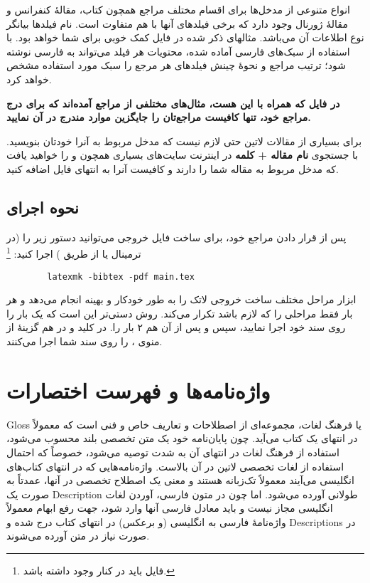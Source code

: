 انواع متنوعی از مدخل‌ها برای اقسام مختلف مراجع همچون کتاب، مقالهٔ کنفرانس و مقالهٔ ژورنال وجود دارد که برخی فیلدهای آنها با هم متفاوت است.
نام فیلدها بیانگر نوع اطلاعات آن می‌باشد. مثالهای ذکر شده در فایل  کمک خوبی برای شما خواهد بود.
با استفاده از سبک‌های فارسی آماده شده، محتویات هر فیلد می‌تواند به فارسی نوشته شود؛ ترتیب مراجع و نحوهٔ چینش فیلدهای هر مرجع را سبک مورد استفاده  مشخص خواهد کرد.

\textbf{در فایل
	که همراه با این \پ هست، مثال‌های مختلفی از مراجع آمده‌اند که برای درج مراجع خود، تنها کافیست مراجع‌تان را جایگزین موارد مندرج در آن نمایید.
}

برای بسیاری از مقالات لاتین حتی لازم نیست که مدخل مربوط به آنرا خودتان بنویسید. با جستجوی
\textbf{نام مقاله + کلمه
	}
در اینترنت سایت‌های بسیاری همچون
 و 
را خواهید یافت که مدخل
مربوط به مقاله شما را دارند و کافیست آنرا به انتهای فایل
اضافه کنید.

\subsection{نحوه اجرای \texorpdfstring{}{Bib\TeX}}
پس از قرار دادن مراجع خود، برای ساخت فایل خروجی می‌توانید دستور زیر را (در ترمینال یا از طریق ) اجرا کنید:%
\footnote{فایل  باید در کنار  وجود داشته باشد.}

\singlespacing
\begin{LTR}
	\begin{verbatim}
		latexmk -bibtex -pdf main.tex
	\end{verbatim}
\end{LTR}
\doublespacing
ابزار  مراحل مختلف ساخت خروجی لاتک را به طور خودکار و بهینه انجام می‌دهد و هر بار فقط مراحلی را که لازم باشد تکرار می‌کند.
روش دستی‌تر این است که یک بار  را روی سند خود اجرا نمایید، سپس  و پس از آن هم ۲ بار  را. در  کلید  و در  هم گزینهٔ  از منوی ،  را روی سند شما اجرا می‌کنند.

\section{واژه‌نامه‌ها و فهرست اختصارات}
\gls{Gloss}
یا فرهنگ لغات، مجموعه‌ای از اصطلاحات و تعاریف خاص و فنی است که معمولاً در انتهای یک کتاب می‌آید. چون پایان‌نامه خود یک متن تخصصی بلند محسوب می‌شود، استفاده از فرهنگ لغات در انتهای آن به شدت توصیه می‌شود، خصوصاً که احتمال استفاده از لغات تخصصی لاتین در آن بالاست.
واژه‌نامه‌هایی که در انتهای کتاب‌های انگلیسی می‌آیند معمولاً تک‌زبانه هستند و معنی یک اصطلاح تخصصی در آنها، عمدتاً به صورت یک
\gls{Description}
طولانی آورده می‌شود. اما چون در متون فارسی، آوردن لغات انگلیسی مجاز نیست و باید معادل فارسی آنها وارد شود، جهت رفع ابهام معمولاً واژه‌نامهٔ فارسی به انگلیسی (و برعکس) در انتهای کتاب درج شده و
\glspl{Description}
در صورت نیاز در متن آورده می‌شوند.


